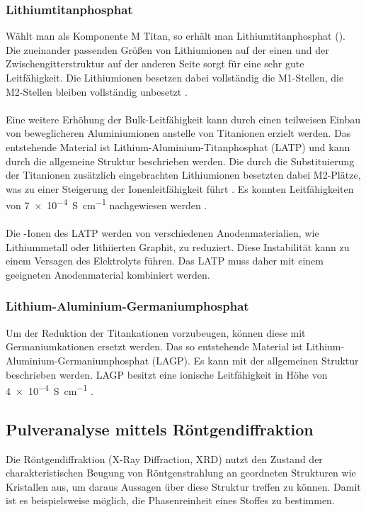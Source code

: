 \documentclass[a4paper, 11pt, headsepline,footsepline,twoside,abstract]{scrbook}
\begin{document}
\subsubsection{Lithiumtitanphosphat}
Wählt man als Komponente M Titan, so erhält man Lithiumtitanphosphat (). Die zueinander passenden Größen von Lithiumionen auf der einen und der Zwischengitterstruktur auf der anderen Seite sorgt für eine sehr gute Leitfähigkeit. Die Lithiumionen besetzen dabei vollständig die M1-Stellen, die M2-Stellen bleiben vollständig unbesetzt \cite{cao2014recent}. 
\\\\
Eine weitere Erhöhung der Bulk-Leitfähigkeit kann durch einen teilweisen Einbau von beweglicheren Aluminiumionen anstelle von Titanionen erzielt werden. Das entstehende Material ist Lithium-Aluminium-Titanphosphat (LATP) und kann durch die allgemeine Struktur  beschrieben werden. Die durch die Substituierung der Titanionen zusätzlich eingebrachten Lithiumionen besetzten dabei M2-Plätze, was zu einer Steigerung der Ionenleitfähigkeit führt \cite{aono1991electrical}. Es konnten Leitfähigkeiten von \SI{7e-4}{\siemens\per\centi\metre} nachgewiesen werden \cite{aono1990ionic}. 
\\\\
Die -Ionen des LATP werden von verschiedenen Anodenmaterialien, wie Lithiummetall oder lithiierten Graphit, zu  reduziert. Diese Instabilität kann zu einem Versagen des Elektrolyts führen. Das LATP muss daher mit einem geeigneten Anodenmaterial kombiniert werden.
\subsubsection{Lithium-Aluminium-Germaniumphosphat}
Um der Reduktion der Titankationen vorzubeugen, können diese mit Germaniumkationen ersetzt werden. Das so entstehende Material ist Lithium-Aluminium-Germaniumphosphat (LAGP). Es kann mit der allgemeinen Struktur  beschrieben werden. LAGP besitzt eine ionische Leitfähigkeit in Höhe von \SI{4e-4}{\siemens\per\centi\metre} \cite{fu1997fast}.
\subsection{Pulveranalyse mittels Röntgendiffraktion}
Die Röntgendiffraktion (X-Ray Diffraction, XRD) nutzt den Zustand der charakteristischen Beugung von Röntgenstrahlung an geordneten Strukturen wie Kristallen aus, um daraus Aussagen über diese Struktur treffen zu können. Damit ist es beispielsweise möglich, die Phasenreinheit eines Stoffes zu bestimmen.
\end{document}
